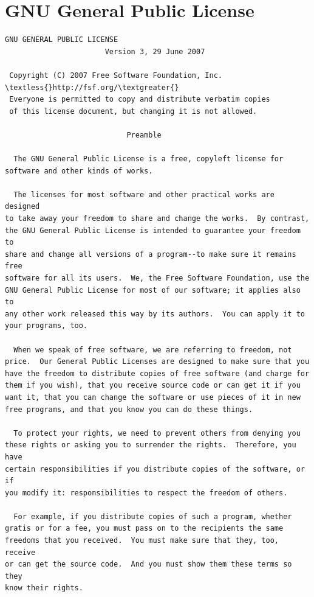 \documentclass[letterpaper,10pt,english]{sphinxmanual}
\begin{document}
\chapter{GNU General Public License}
\label{gpl:gpl}\label{gpl:gnu-general-public-license}\label{gpl::doc}
\begin{Verbatim}[commandchars=\\\{\}]
                    GNU GENERAL PUBLIC LICENSE
                       Version 3, 29 June 2007

 Copyright (C) 2007 Free Software Foundation, Inc. \textless{}http://fsf.org/\textgreater{}
 Everyone is permitted to copy and distribute verbatim copies
 of this license document, but changing it is not allowed.

                            Preamble

  The GNU General Public License is a free, copyleft license for
software and other kinds of works.

  The licenses for most software and other practical works are designed
to take away your freedom to share and change the works.  By contrast,
the GNU General Public License is intended to guarantee your freedom to
share and change all versions of a program--to make sure it remains free
software for all its users.  We, the Free Software Foundation, use the
GNU General Public License for most of our software; it applies also to
any other work released this way by its authors.  You can apply it to
your programs, too.

  When we speak of free software, we are referring to freedom, not
price.  Our General Public Licenses are designed to make sure that you
have the freedom to distribute copies of free software (and charge for
them if you wish), that you receive source code or can get it if you
want it, that you can change the software or use pieces of it in new
free programs, and that you know you can do these things.

  To protect your rights, we need to prevent others from denying you
these rights or asking you to surrender the rights.  Therefore, you have
certain responsibilities if you distribute copies of the software, or if
you modify it: responsibilities to respect the freedom of others.

  For example, if you distribute copies of such a program, whether
gratis or for a fee, you must pass on to the recipients the same
freedoms that you received.  You must make sure that they, too, receive
or can get the source code.  And you must show them these terms so they
know their rights.


\end{Verbatim}
\end{document}
